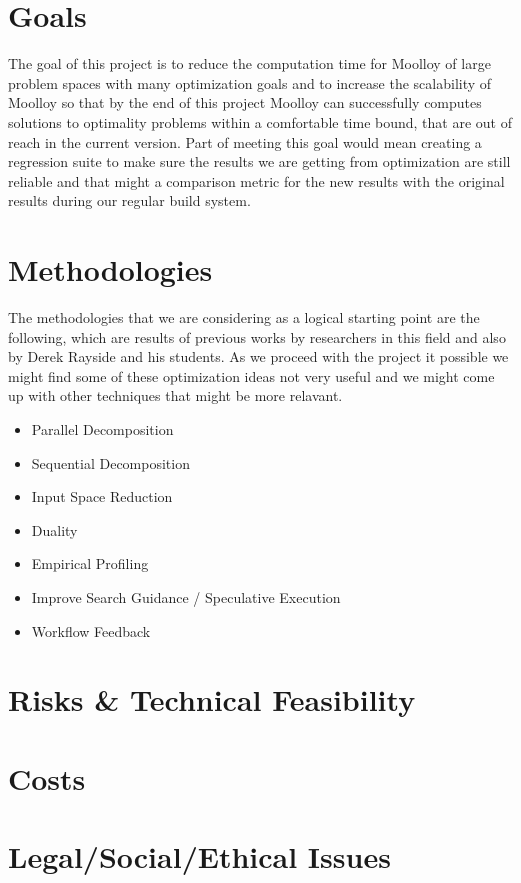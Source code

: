\documentclass[11pt]{article}
\begin{document}
\section{Goals}
The goal of this project is to reduce the computation time for Moolloy of large problem spaces with many optimization goals and to increase the scalability of Moolloy so that by the end of this project Moolloy can successfully computes solutions to optimality problems within a comfortable time bound, that are out of reach in the current version. Part of meeting this  goal would mean creating a regression suite to make sure the results we are getting from optimization are still reliable and that might a comparison metric for the new results with the original results during our regular build system.

\section{Methodologies}
The methodologies that we are considering as a logical starting point are the following, which are results of previous works by researchers in this field and also by Derek Rayside and his students. As we proceed with the project it possible we might find some of these optimization ideas not very useful and we might come up with other techniques that might be more relavant.

\begin{itemize}
  \item Parallel Decomposition
  \item Sequential Decomposition
  \item Input Space Reduction
  \item Duality
  \item Empirical Profiling
  \item Improve Search Guidance / Speculative Execution
  \item Workflow Feedback
\end{itemize}

\section{Risks \& Technical Feasibility}


\section{Costs}

\section{Legal/Social/Ethical Issues}


\printbibliography[heading=bibintoc]
\end{document}
